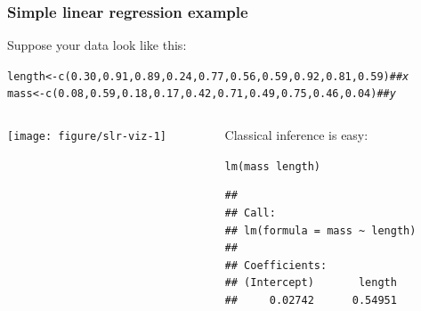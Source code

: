 \documentclass[color=usenames,dvipsnames]{beamer}\usepackage[]{graphicx}\usepackage[]{color}
\makeatletter
\newcommand{\hlnum}[1]{\textcolor[rgb]{0.69,0.494,0}{#1}}%
\newcommand{\hlcom}[1]{\textcolor[rgb]{0.514,0.506,0.514}{\textit{#1}}}%
\newcommand{\hlopt}[1]{\textcolor[rgb]{0,0,0}{#1}}%
\newcommand{\hlstd}[1]{\textcolor[rgb]{0,0,0}{#1}}%
\newcommand{\hlkwb}[1]{\textcolor[rgb]{0,0.341,0.682}{#1}}%
\newcommand{\hlkwd}[1]{\textcolor[rgb]{0.004,0.004,0.506}{#1}}%
\newenvironment{kframe}{%
 \def\at@end@of@kframe{}%
 \ifinner\ifhmode%
  \def\at@end@of@kframe{\end{minipage}}%
  \begin{minipage}{\columnwidth}%
 \fi\fi%
 \def\FrameCommand##1{\hskip\@totalleftmargin \hskip-\fboxsep
 \colorbox{shadecolor}{##1}\hskip-\fboxsep
     \hskip-\linewidth \hskip-\@totalleftmargin \hskip\columnwidth}%
 \MakeFramed {\advance\hsize-\width
   \@totalleftmargin\z@ \linewidth\hsize
   \@setminipage}}%
 {\par\unskip\endMakeFramed%
 \at@end@of@kframe}
\newenvironment{knitrout}{}{} %
\makeatother
\begin{document}
\begin{frame}[fragile]
  \frametitle{Simple linear regression example}
  Suppose your data look like this:
\begin{knitrout}\tiny
{}\color{fgcolor}\begin{kframe}
\begin{alltt}
\hlstd{length} \hlkwb{<-} \hlkwd{c}\hlstd{(}\hlnum{0.30}\hlstd{,} \hlnum{0.91}\hlstd{,} \hlnum{0.89}\hlstd{,} \hlnum{0.24}\hlstd{,} \hlnum{0.77}\hlstd{,} \hlnum{0.56}\hlstd{,} \hlnum{0.59}\hlstd{,} \hlnum{0.92}\hlstd{,} \hlnum{0.81}\hlstd{,} \hlnum{0.59}\hlstd{)}  \hlcom{## x}
\hlstd{mass} \hlkwb{<-} \hlkwd{c}\hlstd{(}\hlnum{0.08}\hlstd{,} \hlnum{0.59}\hlstd{,} \hlnum{0.18}\hlstd{,} \hlnum{0.17}\hlstd{,} \hlnum{0.42}\hlstd{,} \hlnum{0.71}\hlstd{,} \hlnum{0.49}\hlstd{,} \hlnum{0.75}\hlstd{,} \hlnum{0.46}\hlstd{,} \hlnum{0.04}\hlstd{)}    \hlcom{## y}
\end{alltt}
\end{kframe}
\end{knitrout}
\begin{columns}
  \begin{column}{0.5\textwidth}
\begin{knitrout}
\color{fgcolor}
\texttt{[image: figure/slr-viz-1]} 
\end{knitrout}
  \end{column}
  \pause
  \begin{column}{0.5\textwidth}
    Classical inference is easy:
\begin{knitrout}\scriptsize
{}\color{fgcolor}\begin{kframe}
\begin{alltt}
\hlkwd{lm}\hlstd{(mass}\hlopt{~}\hlstd{length)}
\end{alltt}
\begin{verbatim}
## 
## Call:
## lm(formula = mass ~ length)
## 
## Coefficients:
## (Intercept)       length  
##     0.02742      0.54951
\end{verbatim}
\end{kframe}
\end{knitrout}
  \end{column}
\end{columns}
\end{frame}
\end{document}

